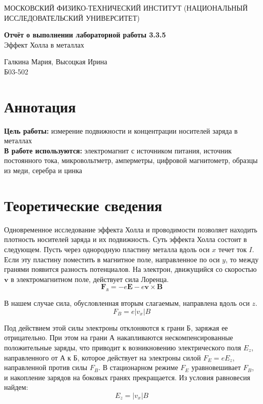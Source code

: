 \documentclass[a4paper,10pt]{article}
\begin{document}
\begin{center}
    {\large МОСКОВСКИЙ ФИЗИКО-ТЕХНИЧЕСКИЙ ИНСТИТУТ (НАЦИОНАЛЬНЫЙ ИССЛЕДОВАТЕЛЬСКИЙ УНИВЕРСИТЕТ)}
\end{center}

\vspace{4.5cm}
{\Large
\begin{center}
\end{center}
{\bf Отчёт о выполнении лабораторной работы 3.3.5}\\
Эффект Холла в металлах
}
\vspace{2cm}
\begin{flushright}
    {\normalsize Галкина Мария, Высоцкая Ирина \\
    \vspace{0.2cm}
    Б03-502}
\end{flushright}
\vspace{8cm}


\section{Аннотация}
\noindent \textbf{Цель работы:} измерение подвижности и концентрации носителей
заряда в металлах\\
\textbf{В работе используются:} электромагнит с источником питания, источник
постоянного тока, микровольтметр, амперметры, цифровой магнитометр, образцы
из меди, серебра и цинка

\section{Теоретические сведения}
Одновременное исследование эффекта Холла и проводимости позволяет находить плотность носителей заряда и их подвижность. Суть эффекта Холла состоит в следующем. Пусть через однородную пластину металла вдоль оси \(x\) течет ток \(I\). Если эту пластину поместить в магнитное поле, направленное по оси \(y\), то между гранями появится разность потенциалов. На электрон, движущийся со скоростью \(\mathbf{v}\) в электромагнитном поле, действует сила Лоренца.
\[
\mathbf{F}_\text{л} = -e\mathbf{E} - e\mathbf{v} \times \mathbf{B}
\]

В нашем случае сила, обусловленная вторым слагаемым, направлена вдоль оси \(z\).
\[
F_B = e |v_x| B
\]

Под действием этой силы электроны отклоняются к грани Б, заряжая ее отрицательно. При этом на грани А накапливаются нескомпенсированные положительные заряды, что приводит к возникновению электрического поля \(E_z\), направленного от А к Б, которое действует на электроны силой \(F_E = eE_z\), направленной против силы \(F_B\). В стационарном режиме \(F_E\) уравновешивает \(F_B\), и накопление зарядов на боковых гранях прекращается. Из условия равновесия найдем:
\[
E_z = |v_x| B
\]
\end{document}
